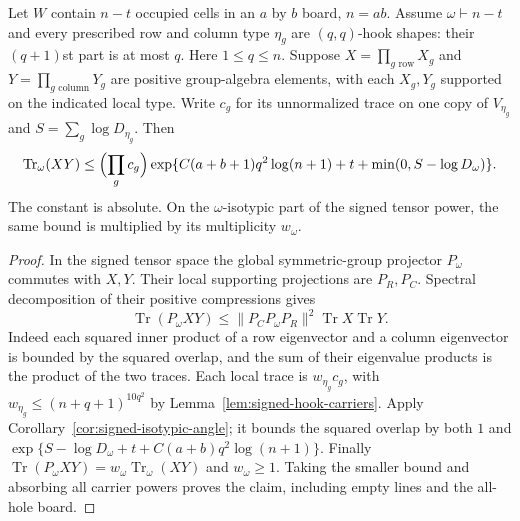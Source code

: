 \begin{proposition}
\label{s:one-sided-marked-overlap}
Let $W$ contain $n-t$ occupied cells in an $a$ by $b$ board, $n=ab$.
Assume $\omega\vdash n-t$ and every prescribed row and column type
$\eta_g$ are $(q,q)$-hook shapes: their $(q+1)$st part is at most $q$.
Here $1\le q\le n$.
Suppose $X=\prod_{g\text{ row}}X_g$ and
$Y=\prod_{g\text{ column}}Y_g$ are positive group-algebra elements,
with each $X_g,Y_g$ supported on the indicated local type. Write
$c_g$ for its unnormalized trace on one copy of $V_{\eta_g}$ and
$S=\sum_g\log D_{\eta_g}$. Then
\[
 \operatorname{Tr}_{\omega}(XY)
 \le\Bigl(\prod_g c_g\Bigr)
 \exp\{C(a+b+1)q^2\log(n+1)+t
                  +\min(0,S-\log D_\omega)\}.
\]
The constant is absolute. On the $\omega$-isotypic part of the signed
tensor power, the same bound is multiplied by its multiplicity
$w_\omega$.
\end{proposition}
\begin{proof}
In the signed tensor space the global symmetric-group projector
$P_\omega$ commutes with $X,Y$. Their local supporting projections
are $P_R,P_C$. Spectral decomposition of their positive compressions gives
\[
 \operatorname{Tr}(P_\omega XY)
 \le \|P_CP_\omega P_R\|^2\operatorname{Tr}X\operatorname{Tr}Y.
\]
Indeed each squared inner product of a row eigenvector and a column
eigenvector is bounded by the squared overlap, and the sum of their
eigenvalue products is the product of the two traces. Each local
trace is $w_{\eta_g}c_g$, with
$w_{\eta_g}\le(n+q+1)^{10q^2}$ by
Lemma~\ref{lem:signed-hook-carriers}. Apply
Corollary~\ref{cor:signed-isotypic-angle}; it bounds the squared overlap
by both $1$ and
$\exp\{S-\log D_\omega+t+C(a+b)q^2\log(n+1)\}$.
Finally $\operatorname{Tr}(P_\omega XY)=w_\omega
\operatorname{Tr}_\omega(XY)$ and $w_\omega\ge1$.
Taking the smaller bound and absorbing all carrier powers proves the
claim, including empty lines and the all-hole board.
\end{proof}

